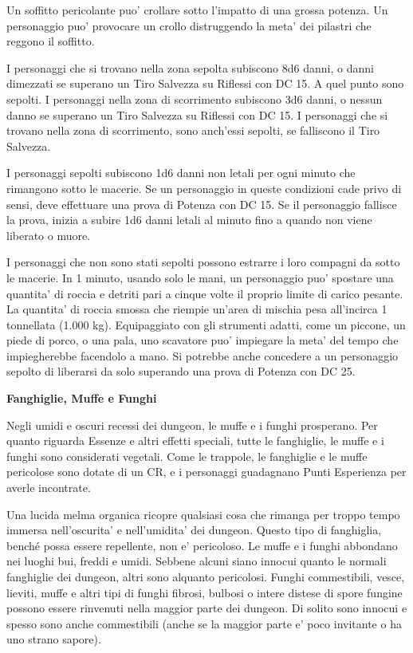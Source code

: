 \documentclass[a4paper,11pt,twoside,openany]{book}
\begin{document}
Un soffitto pericolante puo' crollare sotto l'impatto di una grossa potenza. Un personaggio puo' provocare un crollo distruggendo la meta' dei pilastri che reggono il soffitto.

I personaggi che si trovano nella zona sepolta subiscono 8d6 danni, o danni dimezzati se superano un Tiro Salvezza su Riflessi con DC 15. A quel punto sono sepolti. I personaggi nella zona di scorrimento subiscono 3d6 danni, o nessun danno se superano un Tiro Salvezza su Riflessi con DC 15. I personaggi che si trovano nella zona di scorrimento, sono anch'essi sepolti, se falliscono il Tiro Salvezza.

I personaggi sepolti subiscono 1d6 danni non letali per ogni minuto che rimangono sotto le macerie. Se un personaggio in queste condizioni cade privo di sensi, deve effettuare una prova di Potenza con DC 15. Se il personaggio fallisce la prova, inizia a subire 1d6 danni letali al minuto fino a quando non viene liberato o muore.

I personaggi che non sono stati sepolti possono estrarre i loro compagni da sotto le macerie. In 1 minuto, usando solo le mani, un personaggio puo' spostare una quantita' di roccia e detriti pari a cinque volte il proprio limite di carico pesante. La quantita' di roccia smossa che riempie un'area di mischia pesa all'incirca 1 tonnellata (1.000 kg). Equipaggiato con gli strumenti adatti, come un piccone, un piede di porco, o una pala, uno scavatore puo' impiegare la meta' del tempo che impiegherebbe facendolo a mano. Si potrebbe anche concedere a un personaggio sepolto di liberarsi da solo superando una prova di Potenza con DC 25.

\textbf{Fanghiglie, Muffe e Funghi}

Negli umidi e oscuri recessi dei dungeon, le muffe e i funghi prosperano. Per quanto riguarda Essenze e altri effetti speciali, tutte le fanghiglie, le muffe e i funghi sono considerati vegetali. Come le trappole, le fanghiglie e le muffe pericolose sono dotate di un CR, e i personaggi guadagnano Punti Esperienza per averle incontrate.

Una lucida melma organica ricopre qualsiasi cosa che rimanga per troppo tempo immersa nell'oscurita' e nell'umidita' dei dungeon. Questo tipo di fanghiglia, benché possa essere repellente, non e' pericoloso. Le muffe e i funghi abbondano nei luoghi bui, freddi e umidi. Sebbene alcuni siano innocui quanto le normali fanghiglie dei dungeon, altri sono alquanto pericolosi. Funghi commestibili, vesce, lieviti, muffe e altri tipi di funghi fibrosi, bulbosi o intere distese di spore fungine possono essere rinvenuti nella maggior parte dei dungeon. Di solito sono innocui e spesso sono anche commestibili (anche se la maggior parte e' poco invitante o ha uno strano sapore).
\end{document}
